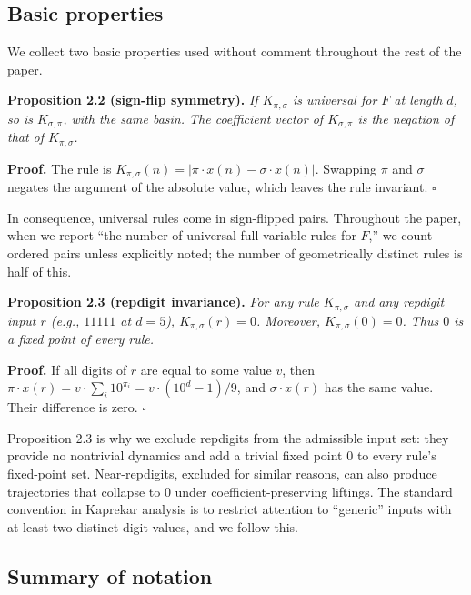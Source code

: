 \documentclass[11pt,letterpaper]{article}
\theoremstyle{paperstyle}
\theoremstyle{paperstyledef}
\theoremstyle{paperstylerem}
\begin{document}
\hypertarget{basic-properties}{%
\subsection{Basic properties}\label{basic-properties}}

We collect two basic properties used without comment throughout the rest
of the paper.

\textbf{Proposition 2.2 (sign-flip symmetry).} \emph{If
\(K_{\pi, \sigma}\) is universal for \(F\) at length \(d\), so is
\(K_{\sigma, \pi}\), with the same basin. The coefficient vector of
\(K_{\sigma, \pi}\) is the negation of that of \(K_{\pi, \sigma}\).}

\textbf{Proof.} The rule is
\(K_{\pi, \sigma}(n) = |\pi \cdot x(n) - \sigma \cdot x(n)|\). Swapping
\(\pi\) and \(\sigma\) negates the argument of the absolute value, which
leaves the rule invariant. \(\square\)

In consequence, universal rules come in sign-flipped pairs. Throughout
the paper, when we report ``the number of universal full-variable rules
for \(F\),'' we count ordered pairs unless explicitly noted; the number
of geometrically distinct rules is half of this.

\textbf{Proposition 2.3 (repdigit invariance).} \emph{For any rule
\(K_{\pi, \sigma}\) and any repdigit input \(r\) (e.g., \(11111\) at
\(d = 5\)), \(K_{\pi, \sigma}(r) = 0\). Moreover,
\(K_{\pi, \sigma}(0) = 0\). Thus \(0\) is a fixed point of every rule.}

\textbf{Proof.} If all digits of \(r\) are equal to some value \(v\),
then
\(\pi \cdot x(r) = v \cdot \sum_i 10^{\pi_i} = v \cdot (10^d - 1)/9\),
and \(\sigma \cdot x(r)\) has the same value. Their difference is zero.
\(\square\)

Proposition 2.3 is why we exclude repdigits from the admissible input
set: they provide no nontrivial dynamics and add a trivial fixed point
\(0\) to every rule's fixed-point set. Near-repdigits, excluded for
similar reasons, can also produce trajectories that collapse to \(0\)
under coefficient-preserving liftings. The standard convention in
Kaprekar analysis is to restrict attention to ``generic'' inputs with at
least two distinct digit values, and we follow this.

\hypertarget{summary-of-notation}{%
\subsection{Summary of notation}\label{summary-of-notation}}
\end{document}
